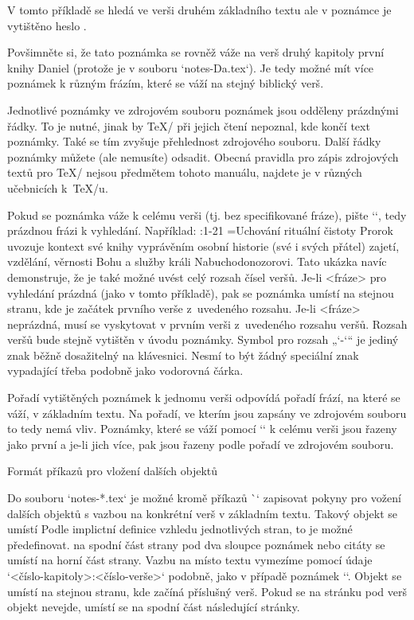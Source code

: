 \endtt
V tomto příkladě se hledá ve verši druhém základního textu  
ale v poznámce je vytištěno heslo .

Povšimněte si, že tato poznámka se rovněž váže na verš druhý kapitoly první
knihy Daniel (protože je v souboru `notes-Da.tex`). Je tedy možné mít více
poznámek k různým frázím, které se váží na stejný biblický verš. 

Jednotlivé poznámky ve zdrojovém souboru poznámek jsou odděleny prázdnými
řádky. To je nutné, jinak by \TeX/ při jejich čtení nepoznal, kde končí text
poznámky. Také se tím zvyšuje přehlednost zdrojového souboru. Další řádky
poznámky můžete (ale nemusíte) odsadit. Obecná pravidla pro zápis
zdrojových textů pro \TeX/ nejsou předmětem tohoto manuálu, najdete je v
různých učebnicích k~\TeX/u.

Pokud se poznámka váže k celému verši (tj. bez specifikované fráze), pište
`{}`, tedy prázdnou frázi k vyhledání. Například:
\begtt
{}:1-21 {}={Uchování rituální čistoty}  Prorok uvozuje kontext své knihy vyprávěním
   osobní historie (své i svých přátel) zajetí, vzdělání, věrnosti Bohu a služby 
   králi Nabuchodonozorovi.
\endtt
Tato ukázka navíc demonstruje, že je také možné uvést celý rozsah čísel veršů.
Je-li <fráze> pro vyhledání prázdná (jako v tomto příkladě), pak se poznámka
umístí na stejnou stranu, kde je začátek prvního verše z~uvedeného rozsahu.
Je-li <fráze> neprázdná, musí se vyskytovat v prvním verši z~uvedeného
rozsahu veršů. Rozsah veršů bude stejně vytištěn v úvodu poznámky.
Symbol pro rozsah „`-`“ je jediný znak  běžně dosažitelný na
klávesnici. Nesmí to být žádný speciální znak vypadající třeba podobně jako
vodorovná čárka.

Pořadí vytištěných poznámek k jednomu verši odpovídá pořadí frází, na které
se váží, v základním textu. Na pořadí, ve kterím jsou zapsány ve zdrojovém
souboru to tedy nemá vliv. Poznámky, které se váží pomocí `{}` k celému
verši jsou řazeny jako první a je-li jich více, pak jsou řazeny podle pořadí
ve zdrojovém souboru.

\secc[clanky] Formát příkazů pro vložení dalších objektů

Do souboru `notes-*.tex` je možné kromě příkazů \`\Note` zapisovat pokyny pro
vožení dalších objektů s vazbou na konkrétní verš v základním textu. Takový
objekt se umístí\fnote
{Podle implictní definice vzhledu jednotlivých stran, to je možné předefinovat.}
na spodní část strany pod dva sloupce poznámek nebo citáty se umístí na
horní část strany. Vazbu na místo textu
vymezíme pomocí údaje `<číslo-kapitoly>:<číslo-verše>` podobně,
jako v případě poznámek
`\Note`. Objekt se umístí na stejnou stranu, kde začíná příslušný verš.
Pokud se na stránku pod verš objekt nevejde, umístí se na spodní část
následující stránky.

